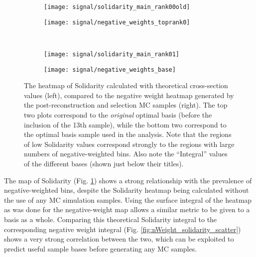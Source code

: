     \begin{figure}[tbh]
    	\centering
        \begin{subfigure}{0.48\textwidth}
            \texttt{[image: signal/solidarity\_main\_rank00old]}
            \captionsetup{justification=centering} \caption{}
        \end{subfigure}
        \begin{subfigure}{0.48\textwidth}
            \texttt{[image: signal/negative\_weights\_toprank0]}
            \captionsetup{justification=centering} \caption{}
        \end{subfigure}
        \\
        \begin{subfigure}{0.48\textwidth}
            \texttt{[image: signal/solidarity\_main\_rank01]}
            \captionsetup{justification=centering} \caption{}
        \end{subfigure}
        \begin{subfigure}{0.5\textwidth}
            \texttt{[image: signal/negative\_weights\_base]}
            \captionsetup{justification=centering} \caption{}
        \end{subfigure}
        \caption{
            The heatmap of Solidarity calculated with theoretical cross-section values (left),
                compared to the negative weight heatmap generated by the post-reconstruction and selection MC samples (right).
            The top two plots correspond to the \textit{original} optimal basis (before the inclusion of the 13th sample),
                while the bottom two correspond to the optimal basis sample used in the analysis.
            Note that the regions of low Solidarity values correspond strongly to the regions with large numbers of negative-weighted bins.
            Also note the ``Integral'' values of the different bases (shown just below their titles).
        }
        \label{fig:solidarity_heatmaps}
    \end{figure}

    The map of Solidarity (Fig. \ref{fig:solidarity_heatmaps}) shows a strong relationship with the prevalence of negative-weighted bins,
        despite the Solidarity heatmap being calculated without the use of any MC simulation samples.
    Using the surface integral of the heatmap as was done for the negative-weight map allows a similar metric to be given to a basis as a whole.
    Comparing this theoretical Solidarity integral to the corresponding negative weight integral (Fig. \ref{fig:nWeight_solidarity_scatter})
        shows a very strong correlation between the two,
        which can be exploited to predict useful sample bases before generating any MC samples.

